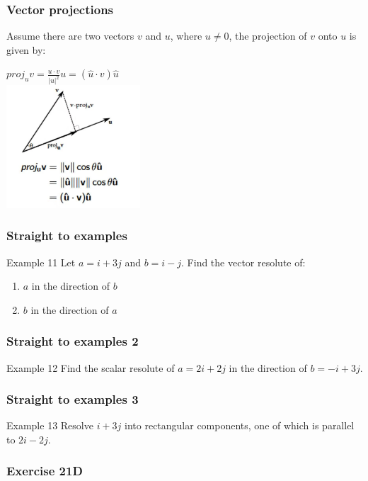 \documentclass[
	11pt, %
]{beamer}
\begin{document}
\begin{frame}
    \frametitle{Vector projections}
    Assume there are two vectors $v$ and $u$, where $u \neq 0$, the projection of $v$ onto $u$ is given by:\\
    \begin{center}
        $proj_uv = \frac{u\cdot v}{|u|^2}u = (\hat{u}\cdot v)\hat{u}$\\
        \includegraphics[width = 5cm]{Vector_pro.jpg}
    \end{center}
\end{frame}

\begin{frame}[t]
    \frametitle{Straight to examples}
    \begin{block}{Example 11}
        Let $a = i + 3j$ and $b = i-j$. Find the vector resolute of:
        \begin{enumerate}
            \item $a$ in the direction of $b$
            \item $b$ in the direction of $a$
        \end{enumerate}
    \end{block}
\end{frame}

\begin{frame}[t]
    \frametitle{Straight to examples 2}
    \begin{block}{Example 12}
        Find the scalar resolute of $a = 2i + 2j$ in the direction of $b = -i + 3j$.
    \end{block}
\end{frame}

\begin{frame}[t]
    \frametitle{Straight to examples 3}
    \begin{block}{Example 13}
        Resolve $i + 3j$ into rectangular components, one of which is parallel to $2i- 2j$.
    \end{block}
\end{frame}

\begin{frame}
    \frametitle{Exercise 21D}
\end{frame}
\end{document}
